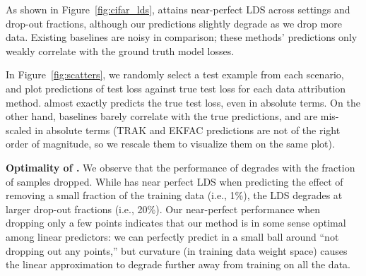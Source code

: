 As shown in Figure~\ref{fig:cifar_lds}, \method{} attains near-perfect
LDS across settings and drop-out fractions,
although our predictions slightly degrade as we drop more data.
Existing baselines are noisy in comparison; these methods' predictions only
weakly correlate with the ground truth model losses.

In Figure~\ref{fig:scatters}, we randomly select a test example 
from each scenario, and plot predictions of test loss against true test loss for
each data attribution method. \method{} almost exactly predicts the true test
loss, even in absolute terms. On the other hand, baselines barely correlate
with the true predictions, and are mis-scaled in absolute terms
(TRAK and EKFAC predictions are not of the right order of magnitude,
so we rescale them to visualize them on the same plot).

\medskip
\noindent \textbf{Optimality of \method{}.} We observe that the performance of
\method{} degrades with the fraction of samples dropped. While \method{} has
near perfect LDS when predicting the effect of removing a small fraction of the
training data (i.e., 1\%), the LDS degrades at larger drop-out fractions
(i.e., 20\%). Our near-perfect performance when dropping only a few points
indicates that our method is in some sense optimal among linear predictors: 
we can perfectly predict in a small ball around ``not dropping out any points,'' 
but curvature (in training data weight space) 
causes the linear approximation to degrade
further away from training on all the data.

